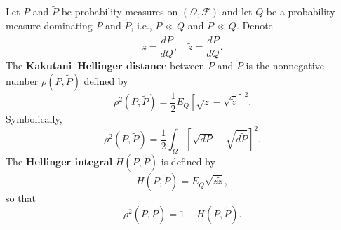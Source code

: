 Let $P$ and $\tilde{P}$ be probability measures on $(\Omega, \mathcal{F})$ and let $Q$ be a probability measure dominating $P$ and $\tilde{P}$, i.e., $P \ll Q$ and $\tilde{P} \ll Q$. Denote
$$z = \frac{dP}{dQ}, \quad \tilde{z} = \frac{d\tilde{P}}{dQ}.$$
The \textbf{Kakutani--Hellinger distance} between $P$ and $\tilde{P}$ is the nonnegative number $\rho(P, \tilde{P})$ defined by
$$\rho^2(P, \tilde{P}) = \frac{1}{2} E_Q\left[\sqrt{z} - \sqrt{\tilde{z}}\right]^2.$$
Symbolically,
$$\rho^2(P, \tilde{P}) = \frac{1}{2} \int_\Omega \left[\sqrt{dP} - \sqrt{d\tilde{P}}\right]^2.$$
The \textbf{Hellinger integral} $H(P, \tilde{P})$ is defined by
$$H(P, \tilde{P}) = E_Q\sqrt{z\tilde{z}},$$
so that
$$\rho^2(P, \tilde{P}) = 1 - H(P, \tilde{P}).$$
